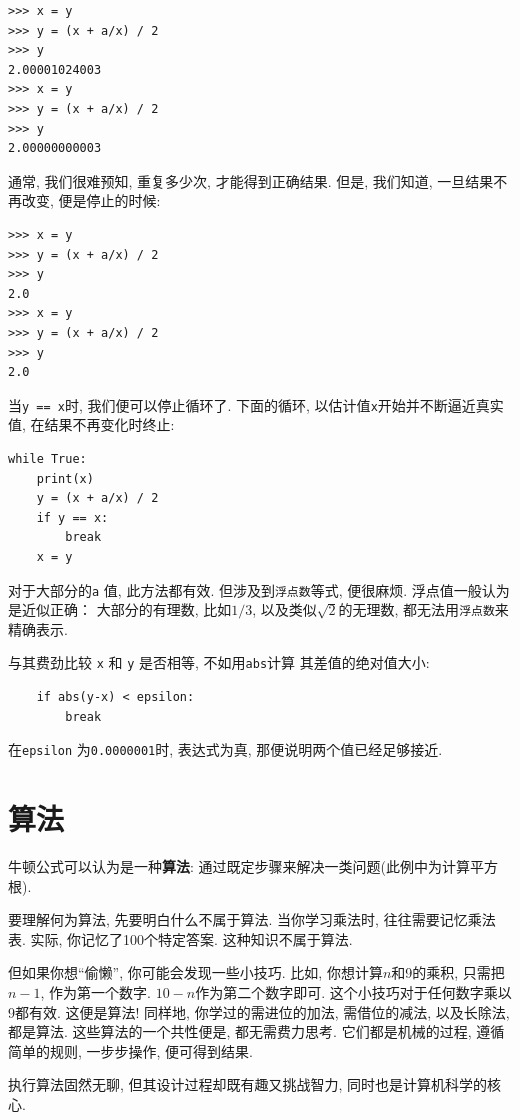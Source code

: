 \documentclass[10pt]{book}
\begin{document}
\begin{verbatim}
>>> x = y
>>> y = (x + a/x) / 2
>>> y
2.00001024003
>>> x = y
>>> y = (x + a/x) / 2
>>> y
2.00000000003
\end{verbatim}
%
通常, 我们很难预知, 重复多少次, 才能得到正确结果. 
但是, 我们知道, 一旦结果不再改变, 便是停止的时候:

\begin{verbatim}
>>> x = y
>>> y = (x + a/x) / 2
>>> y
2.0
>>> x = y
>>> y = (x + a/x) / 2
>>> y
2.0
\end{verbatim}
%
当{\tt y == x}时, 我们便可以停止循环了. 
下面的循环, 以估计值{\tt x}开始并不断逼近真实值, 在结果不再变化时终止:

\begin{verbatim}
while True:
    print(x)
    y = (x + a/x) / 2
    if y == x:
        break
    x = y
\end{verbatim}
%
对于大部分的{\tt a} 值, 此方法都有效. 
但涉及到{\tt 浮点数}等式, 便很麻烦. 
浮点值一般认为是近似正确：
大部分的有理数, 比如$1/3$, 
以及类似$\sqrt{2}$的无理数, 都无法用{\tt 浮点数}来精确表示. 

与其费劲比较 {\tt x} 和 {\tt y} 是否相等, 不如用{\tt abs}计算
其差值的绝对值大小:

\begin{verbatim}
    if abs(y-x) < epsilon:
        break
\end{verbatim}
%
在\verb"epsilon" 为{\tt 0.0000001}时, 表达式为真, 
那便说明两个值已经足够接近. 


\section{算法}
牛顿公式可以认为是一种{\bf 算法}:
通过既定步骤来解决一类问题(此例中为计算平方根). 

要理解何为算法, 先要明白什么不属于算法. 
当你学习乘法时, 往往需要记忆乘法表. 
实际, 你记忆了100个特定答案. 这种知识不属于算法. 

但如果你想``偷懒'', 你可能会发现一些小技巧. 
比如, 你想计算$n$和9的乘积, 只需把$n-1$, 作为第一个数字. 
$10-n$作为第二个数字即可. 这个小技巧对于任何数字乘以9都有效. 
这便是算法!
同样地, 你学过的需进位的加法, 需借位的减法, 以及长除法, 
都是算法. 这些算法的一个共性便是, 都无需费力思考. 
它们都是机械的过程, 
遵循简单的规则, 一步步操作, 便可得到结果. 

执行算法固然无聊, 但其设计过程却既有趣又挑战智力, 
同时也是计算机科学的核心. 
\end{document}
